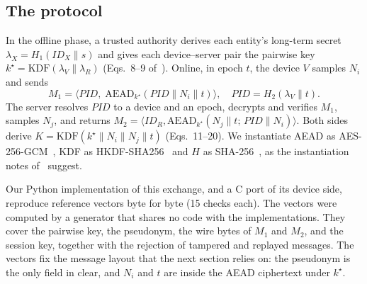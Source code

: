 \subsection{The protocol}
In the offline phase, a trusted authority derives each entity's long-term secret $\lambda_X=H_1(ID_X\|s)$ and gives
each device--server pair the pairwise key $k^\star=\mathrm{KDF}(\lambda_V\|\lambda_R)$ (Eqs.~8--9 of~\cite{base}). Online,
in epoch $t$, the device $V$ samples $N_i$ and sends
\begin{equation*}
M_1=\langle PID,\;\mathrm{AEAD}_{k^\star}(PID\|N_i\|t)\rangle,\quad PID=H_2(\lambda_V\|t).
\end{equation*}
The server resolves $PID$ to a device and an epoch, decrypts and verifies $M_1$, samples $N_j$, and returns
$M_2=\langle ID_R,\mathrm{AEAD}_{k^\star}(N_j\|t;\,PID\|N_i)\rangle$. Both sides derive
$K=\mathrm{KDF}(k^\star\|N_i\|N_j\|t)$ (Eqs.~11--20). We instantiate AEAD as AES-256-GCM~\cite{gcm}, KDF as
HKDF-SHA256~\cite{hkdf} and $H$ as SHA-256~\cite{fips180}, as the instantiation notes of~\cite{base} suggest.

Our Python implementation of this exchange, and a C port of its device side, reproduce reference vectors byte for byte
(15 checks each). The vectors were computed by a generator that shares no code with the implementations. They cover the
pairwise key, the pseudonym, the wire bytes of $M_1$ and $M_2$, and the session key, together with the rejection of
tampered and replayed messages. The vectors fix the message layout that the next section relies on: the pseudonym is the
only field in clear, and $N_i$ and $t$ are inside the AEAD ciphertext under $k^\star$.

